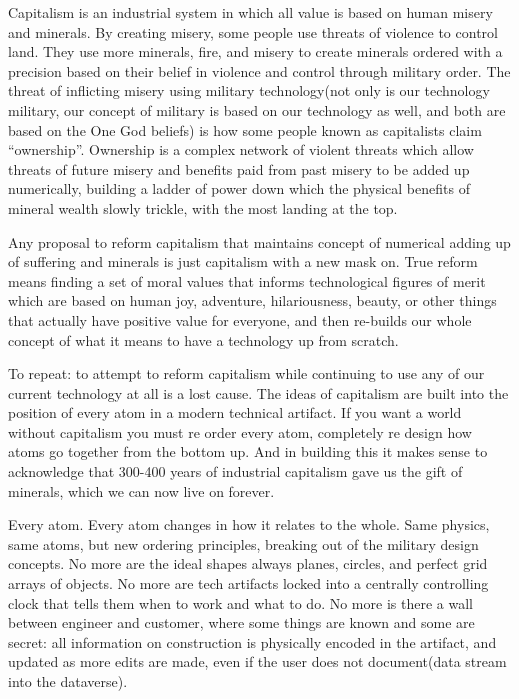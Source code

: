 Capitalism is an industrial system in which all value is based on human
misery and minerals. By creating misery, some people use threats of
violence to control land. They use more minerals, fire, and misery to
create minerals ordered with a precision based on their belief in
violence and control through military order. The threat of inflicting
misery using military technology(not only is our technology military,
our concept of military is based on our technology as well, and both are
based on the One God beliefs) is how some people known as capitalists
claim ``ownership''. Ownership is a complex network of violent threats
which allow threats of future misery and benefits paid from past misery
to be added up numerically, building a ladder of power down which the
physical benefits of mineral wealth slowly trickle, with the most
landing at the top.

Any proposal to reform capitalism that maintains concept of numerical
adding up of suffering and minerals is just capitalism with a new mask
on. True reform means finding a set of moral values that informs
technological figures of merit which are based on human joy, adventure,
hilariousness, beauty, or other things that actually have positive value
for everyone, and then re-builds our whole concept of what it means to
have a technology up from scratch.

To repeat: to attempt to reform capitalism while continuing to use any
of our current technology at all is a lost cause. The ideas of
capitalism are built into the position of every atom in a modern
technical artifact. If you want a world without capitalism you must re
order every atom, completely re design how atoms go together from the
bottom up. And in building this it makes sense to acknowledge that
300-400 years of industrial capitalism gave us the gift of minerals,
which we can now live on forever.

Every atom. Every atom changes in how it relates to the whole. Same
physics, same atoms, but new ordering principles, breaking out of the
military design concepts. No more are the ideal shapes always planes,
circles, and perfect grid arrays of objects. No more are tech artifacts
locked into a centrally controlling clock that tells them when to work
and what to do. No more is there a wall between engineer and customer,
where some things are known and some are secret: all information on
construction is physically encoded in the artifact, and updated as more
edits are made, even if the user does not document(data stream into the
dataverse).


